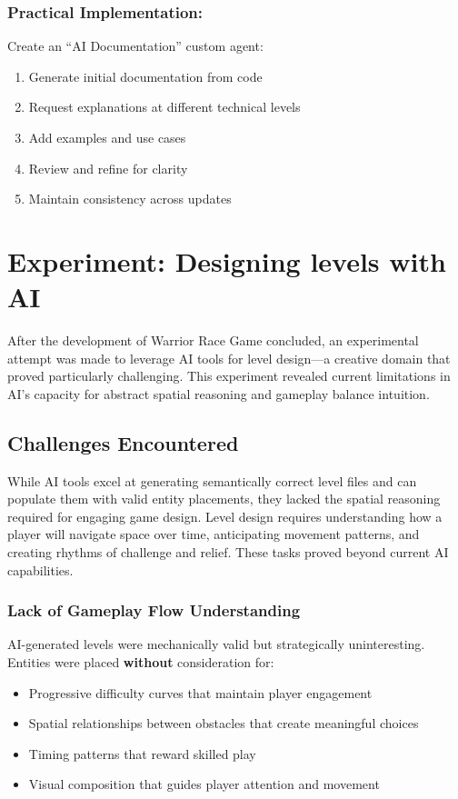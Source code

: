 \documentclass[12pt,a4paper]{article}
\begin{document}
\subsubsection*{Practical Implementation:}

Create an ``AI Documentation'' custom agent:
\begin{enumerate}
    \item Generate initial documentation from code
    \item Request explanations at different technical levels
    \item Add examples and use cases
    \item Review and refine for clarity
    \item Maintain consistency across updates
\end{enumerate}

\newpage

\section{Experiment: Designing levels with AI}

After the development of Warrior Race Game concluded, an experimental attempt was made to leverage AI tools for level design---a creative domain that proved particularly challenging. This experiment revealed current limitations in AI's capacity for abstract spatial reasoning and gameplay balance intuition.

\subsection{Challenges Encountered}

While AI tools excel at generating semantically correct level files and can populate them with valid entity placements, they lacked the spatial reasoning required for engaging game design. Level design requires understanding how a player will navigate space over time, anticipating movement patterns, and creating rhythms of challenge and relief. These tasks proved beyond current AI capabilities.

\subsubsection*{Lack of Gameplay Flow Understanding}

AI-generated levels were mechanically valid but strategically uninteresting. Entities were placed \textbf{without} consideration for:
\begin{itemize}
    \item Progressive difficulty curves that maintain player engagement
    \item Spatial relationships between obstacles that create meaningful choices
    \item Timing patterns that reward skilled play
    \item Visual composition that guides player attention and movement
\end{itemize}
\end{document}
